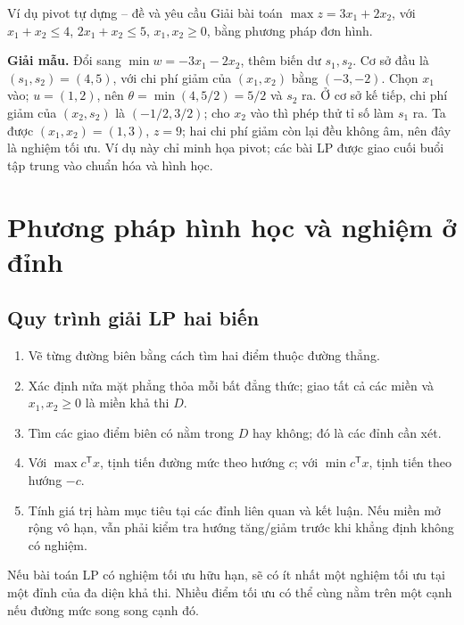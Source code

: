 \documentclass[11pt,a4paper]{article}
\newcommand{\T}{^{\mathsf T}}
\begin{document}
\clearpage
\begin{questionbox}{Ví dụ pivot tự dựng -- đề và yêu cầu}
Giải bài toán \(\max z=3x_1+2x_2\), với \(x_1+x_2\le4\), \(2x_1+x_2\le5\), \(x_1,x_2\ge0\), bằng phương pháp đơn hình.
\end{questionbox}
\textbf{Giải mẫu.} Đổi sang \(\min w=-3x_1-2x_2\), thêm biến dư \(s_1,s_2\). Cơ sở đầu là \((s_1,s_2)=(4,5)\), với chi phí giảm của \((x_1,x_2)\) bằng \((-3,-2)\). Chọn \(x_1\) vào; \(u=(1,2)\), nên \(\theta=\min(4,5/2)=5/2\) và \(s_2\) ra. Ở cơ sở kế tiếp, chi phí giảm của \((x_2,s_2)\) là \((-1/2,3/2)\); cho \(x_2\) vào thì phép thử tỉ số làm \(s_1\) ra. Ta được \((x_1,x_2)=(1,3)\), \(z=9\); hai chi phí giảm còn lại đều không âm, nên đây là nghiệm tối ưu. Ví dụ này chỉ minh họa pivot; các bài LP được giao cuối buổi tập trung vào chuẩn hóa và hình học.

\section{Phương pháp hình học và nghiệm ở đỉnh}
\subsection{Quy trình giải LP hai biến}
\begin{enumerate}
\item Vẽ từng đường biên bằng cách tìm hai điểm thuộc đường thẳng.
\item Xác định nửa mặt phẳng thỏa mỗi bất đẳng thức; giao tất cả các miền và \(x_1,x_2\ge0\) là miền khả thi \(D\).
\item Tìm các giao điểm biên có nằm trong \(D\) hay không; đó là các đỉnh cần xét.
\item Với \(\max c\T x\), tịnh tiến đường mức theo hướng \(c\); với \(\min c\T x\), tịnh tiến theo hướng \(-c\).
\item Tính giá trị hàm mục tiêu tại các đỉnh liên quan và kết luận. Nếu miền mở rộng vô hạn, vẫn phải kiểm tra hướng tăng/giảm trước khi khẳng định không có nghiệm.
\end{enumerate}
Nếu bài toán LP có nghiệm tối ưu hữu hạn, sẽ có ít nhất một nghiệm tối ưu tại một đỉnh của đa diện khả thi. Nhiều điểm tối ưu có thể cùng nằm trên một cạnh nếu đường mức song song cạnh đó.

\clearpage
\end{document}
